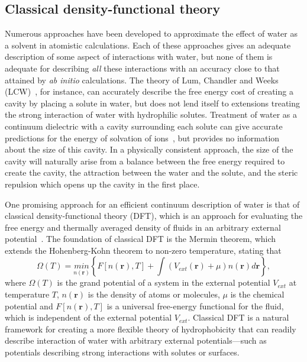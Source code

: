 \documentclass[twocolumn,amsmath,amssymb,prl]{revtex4-1}
\newcommand{\rr}{\textbf{r}}
\begin{document}
\subsection{Classical density-functional theory}

Numerous approaches have been developed to approximate the effect of water
as a solvent in atomistic calculations.  Each of these approaches gives an
adequate description of some aspect of interactions with water, but none of
them is adequate for describing \emph{all} these interactions with an
accuracy close to that attained by \emph{ab initio} calculations.  The
theory of Lum, Chandler and Weeks (LCW)~\cite{lum1999hydrophobicity}, for 
instance, can
accurately describe the free energy cost of creating a cavity by placing a
solute in water, but does not lend itself to extensions treating the strong
interaction of water with hydrophilic solutes.  Treatment of water as a
continuum dielectric with a cavity surrounding each solute can give
accurate predictions for the energy of solvation of ions~\cite{latimer1939,
rashin1985, zhan1998, hsu1999, hildebrandt2004, hildebrandt2007}, but
provides no information about the size of this cavity.  In a physically
consistent approach, the size of the cavity will naturally arise from a
balance between the free energy required to create the cavity, the
attraction between the water and the solute, and the steric repulsion which
opens up the cavity in the first place.

One promising approach for an efficient continuum description of water
is that of classical density-functional theory (DFT), which is an
approach for evaluating the free energy and thermally averaged density
of fluids in an arbitrary external potential~\cite{ebner1976density}.
The foundation of classical DFT is the Mermin
theorem\cite{mermin1965thermal}, which extends the Hohenberg-Kohn
theorem\cite{hohenberg1964inhomogeneous} to non-zero temperature,
stating that
\begin{equation}
  \Omega (T) = \underset{n(\rr)}{min}\left\{ F[n(\rr),T] + \int (V_\textit{ext}(\rr) +\mu)n(\rr)
d\rr\right\},
\end{equation}
where $\Omega (T)$ is the grand potential of a system in the external
potential $V_\textit{ext}$ at temperature $T$, $n(\rr)$ is the density
of atoms or molecules, $\mu$ is the chemical potential and
$F[n(\rr),T]$ is a universal free-energy functional for the fluid,
which is independent of the external potential $V_\textit{ext}$.
Classical DFT is a natural framework for creating a more flexible
theory of hydrophobicity that can readily describe interaction of
water with arbitrary external potentials---such as potentials
describing strong interactions with solutes or surfaces.
\end{document}
